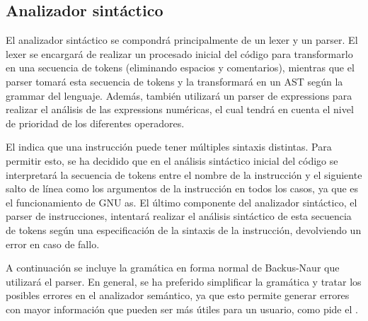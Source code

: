 \FloatBarrier

\subsection{Analizador sintáctico}

El analizador sintáctico se compondrá principalmente de un \gls{lexer} y un
\gls{parser}. El \gls{lexer} se encargará de realizar un procesado inicial del
código para transformarlo en una secuencia de \glspl{token} (eliminando espacios
y comentarios), mientras que el \gls{parser} tomará esta secuencia de
\glspl{token} y la transformará en un \gls{AST} según la \gls{grammar} del
lenguaje. Además, también utilizará un \gls{parser} de \glspl{expression} para
realizar el análisis de las \glspl{expression} numéricas, el cual tendrá en
cuenta el nivel de prioridad de los diferentes operadores.


El  indica que una instrucción puede tener
múltiples sintaxis distintas. Para permitir esto, se ha decidido que en el
análisis sintáctico inicial del código se interpretará la secuencia de
\glspl{token} entre el nombre de la instrucción y el siguiente salto de línea
como los argumentos de la instrucción en todos los casos, ya que es el
funcionamiento de GNU as. %
El último componente del analizador sintáctico, el \gls{parser} de
instrucciones, intentará realizar el análisis sintáctico de esta secuencia de
\glspl{token} según una especificación de la sintaxis de la instrucción,
devolviendo un error en caso de fallo.

A continuación se incluye la gramática en forma normal de Backus-Naur %
que utilizará el \gls{parser}. En general, se ha preferido simplificar la
gramática y tratar los posibles errores en el analizador semántico, ya que esto
permite generar errores con mayor información que pueden ser más útiles para un
usuario, como pide el . %

\newcommand{\EOL}{\textbackslash{}n}
\newcommand{\verbEOL}{`\texttt{\textbackslash{}n}'}

